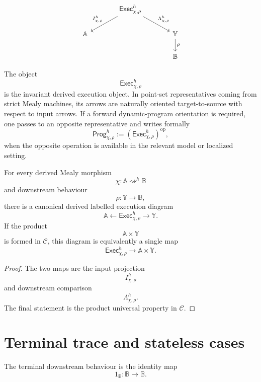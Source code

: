 \[
\begin{tikzcd}[column sep=large]
&
\mathsf{Exec}^h_{\chi,\rho}
\arrow[dl, "I^h_{\chi,\rho}"']
\arrow[dr, "\Lambda^h_{\chi,\rho}"]
&
\\
\mathbb A
&
&
\mathbb Y
\arrow[d, "\rho"]
\\
&
&
\mathbb B
\end{tikzcd}
\]

\begin{remark}
\label{rem:forward-program-orientation-derived}
The object
\[
\mathsf{Exec}^h_{\chi,\rho}
\]
is the invariant derived execution object. In point-set representatives coming
from strict Mealy machines, its arrows are naturally oriented
target-to-source with respect to input arrows. If a forward dynamic-program
orientation is required, one passes to an opposite representative and writes
formally
\[
\mathsf{Prog}^h_{\chi,\rho}
:=
\left(\mathsf{Exec}^h_{\chi,\rho}\right)^{\mathrm{op}},
\]
when the opposite operation is available in the relevant model or localized
setting.
\end{remark}

\begin{proposition}
\label{prop:labelled-contextual-execution-object}
For every derived Mealy morphism
\[
\chi:\mathbb A\rightsquigarrow^h\mathbb B
\]
and downstream behaviour
\[
\rho:\mathbb Y\to\mathbb B,
\]
there is a canonical derived labelled execution diagram
\[
\mathbb A
\longleftarrow
\mathsf{Exec}^h_{\chi,\rho}
\longrightarrow
\mathbb Y.
\]
If the product
\[
\mathbb A\times\mathbb Y
\]
is formed in \(\mathcal C\), this diagram is equivalently a single map
\[
\mathsf{Exec}^h_{\chi,\rho}
\to
\mathbb A\times\mathbb Y.
\]
\end{proposition}

\begin{proof}
The two maps are the input projection
\[
I^h_{\chi,\rho}
\]
and downstream comparison
\[
\Lambda^h_{\chi,\rho}.
\]
The final statement is the product universal property in \(\mathcal C\).
\end{proof}

\section{Terminal trace and stateless cases}
\label{sec:derived-terminal-stateless-cases}

The terminal downstream behaviour is the identity map
\[
1_{\mathbb B}:\mathbb B\to\mathbb B.
\]


